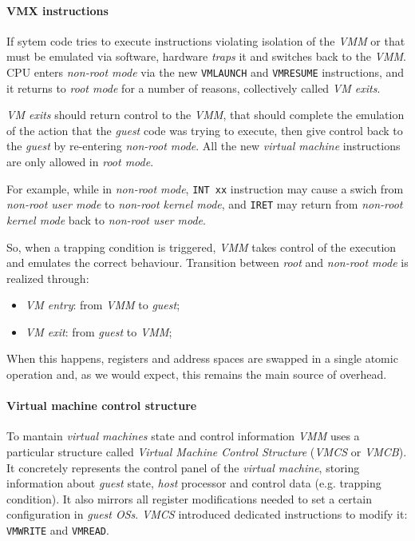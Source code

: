 \paragraph{VMX instructions}
If sytem code tries to execute instructions violating isolation of the \emph{VMM}
or that must be emulated via software, hardware \emph{traps} it and switches back
to the \emph{VMM}. CPU enters \emph{non-root mode} via the new \texttt{VMLAUNCH}
and \texttt{VMRESUME} instructions, and it returns to \emph{root mode} for a
number of reasons, collectively called \emph{VM exits}.

\emph{VM exits} should return control to the \emph{VMM}, that should complete
the emulation of the action that the \emph{guest} code was trying to execute, then
give control back to the \emph{guest} by re-entering \emph{non-root mode}. All
the new \emph{virtual machine} instructions are only allowed in \emph{root mode}.

For example, while in \emph{non-root mode}, \texttt{INT xx} instruction may cause
a swich from \emph{non-root user mode} to \emph{non-root kernel mode}, and
\texttt{IRET} may return from \emph{non-root kernel mode} back to \emph{non-root
user mode}.

\bigskip\noindent
So, when a trapping condition is triggered, \emph{VMM} takes control of the
execution and emulates the correct behaviour. Transition between \emph{root}
and \emph{non-root mode} is realized through:
\begin{itemize}
    \item\emph{VM entry}: from \emph{VMM} to \emph{guest};
    \item\emph{VM exit}: from \emph{guest} to \emph{VMM};
\end{itemize}\noindent
When this happens, registers and address spaces are swapped in a single atomic
operation and, as we would expect, this remains the main source of overhead.

\paragraph{Virtual machine control structure}
To mantain \emph{virtual machines} state and control information \emph{VMM}
uses a particular structure called \emph{Virtual Machine Control Structure}
(\emph{VMCS} or \emph{VMCB}). It concretely represents the control panel of
the \emph{virtual machine}, storing information about \emph{guest} state,
\emph{host} processor and control data (e.g. trapping condition). It also
mirrors all register modifications needed to set a certain configuration in
\emph{guest OSs}. \emph{VMCS} introduced dedicated instructions to modify it:
\texttt{VMWRITE} and \texttt{VMREAD}.

